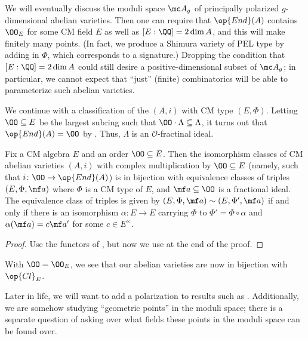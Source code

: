 \documentclass[../notes.tex]{subfiles}
\begin{document}
\begin{remark}
	We will eventually discuss the moduli space $\mc A_g$ of principally polarized $g$-dimensional abelian varieties. Then one can require that $\op{End}(A)$ contains $\OO_E$ for some CM field $E$ as well as $[E:\QQ]=2\dim A$, and this will make finitely many points. (In fact, we produce a Shimura variety of PEL type by adding in $\Phi$, which corresponds to a signature.) Dropping the condition that $[E:\QQ]=2\dim A$ could still desire a positive-dimensional subset of $\mc A_g$; in particular, we cannot expect that ``just'' (finite) combinatorics will be able to parameterize such abelian varieties.
\end{remark}
\begin{remark} \label{rem:fully-classify-cm-ab}
	We continue with a classification of the $(A,i)$ with CM type $(E,\Phi)$. Letting $\OO\subseteq E$ be the largest subring such that $\OO\cdot\Lambda\subseteq\Lambda$, it turns out that $\op{End}(A)=\OO$ by . Thus, $\Lambda$ is an $\mathcal O$-fractinal ideal.
\end{remark}
\begin{corollary}
	Fix a CM algebra $E$ and an order $\OO\subseteq E$. Then the isomorphism classes of CM abelian varieties $(A,i)$ with complex multiplication by $\OO\subseteq E$ (namely, such that $i\colon\OO\to\op{End}(A)$) is in bijection with equivalence classes of triples $(E,\Phi,\mf a)$ where $\Phi$ is a CM type of $E$, and $\mf a\subseteq\OO$ is a fractional ideal. The equivalence class of triples is given by $(E,\Phi,\mf a)\sim(E,\Phi',\mf a)$ if and only if there is an isomorphism $\alpha\colon E\to E$ carrying $\Phi$ to $\Phi'=\Phi\circ\alpha$ and $\alpha(\mf a)=c\mf a'$ for some $c\in E^\times$.
\end{corollary}
\begin{proof}
	Use the functors of , but now we use  at the end of the proof.
\end{proof}
\begin{example}
	With $\OO=\OO_E$, we see that our abelian varieties are now in bijection with $\op{Cl}_E$.
\end{example}
\begin{remark}
	Later in life, we will want to add a polarization to results such as . Additionally, we are somehow studying ``geometric points'' in the moduli space; there is a separate question of asking over what fields these points in the moduli space can be found over.
\end{remark}
\end{document}
